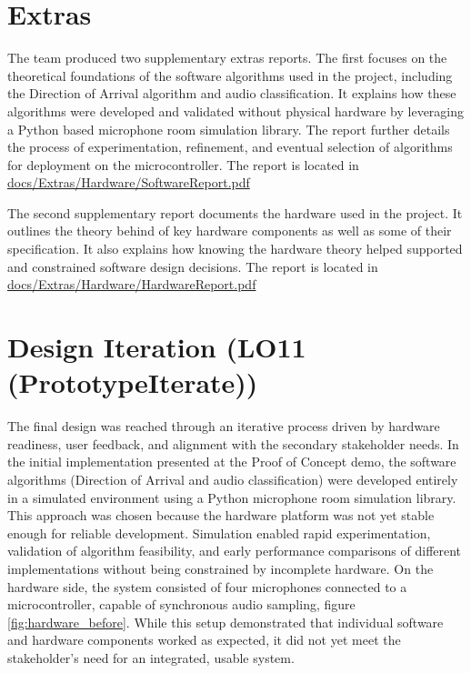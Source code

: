 \documentclass{article}
\begin{document}
\section{Extras}

The team produced two supplementary extras reports. The first focuses on the
theoretical foundations of the software algorithms used in the project,
including the Direction of Arrival algorithm and audio classification. It
explains how these algorithms were developed and validated without physical
hardware by leveraging a Python based microphone room simulation library. The
report further details the process of experimentation, refinement, and eventual
selection of algorithms for deployment on the microcontroller. The report is
located in
\href{https://github.com/Team6-SixSense/audio360/blob/main/docs/Extras/Software/SoftwareReport.pdf}
{docs/Extras/Hardware/SoftwareReport.pdf}

The second supplementary report documents the hardware used in the project. It
outlines the theory behind of key hardware components as well as some of their 
specification. It also explains how knowing the hardware theory helped supported
and constrained software design decisions. The report is located in
\href{https://github.com/Team6-SixSense/audio360/blob/main/docs/Extras/Hardware/HardwareReport.pdf}
{docs/Extras/Hardware/HardwareReport.pdf}

\section{Design Iteration (LO11 (PrototypeIterate))}

The final design was reached through an iterative process driven by hardware
readiness, user feedback, and alignment with the secondary stakeholder needs.
In the initial implementation presented at the Proof of Concept demo, the
software algorithms (Direction of Arrival and audio classification) were
developed entirely in a simulated environment using a Python microphone room
simulation library. This approach was chosen because the hardware platform was
not yet stable enough for reliable development. Simulation enabled rapid
experimentation, validation of algorithm feasibility, and early performance
comparisons of different implementations without being constrained by incomplete
hardware. On the hardware side, the system consisted of four microphones
connected to a microcontroller, capable of synchronous audio sampling,
figure \ref{fig:hardware_before}.
While this setup demonstrated that individual software and hardware components
worked as expected, it did not yet meet the stakeholder's need for an
integrated, usable system.
\end{document}
